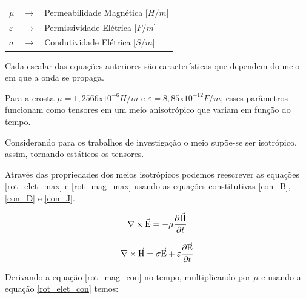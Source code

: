 	        {\footnotesize \noindent
            
            \begin{table}[H]
             \begin{tabular*}{1cm}{p{0.05cm}p{0.1cm}p{10cm}}
               {\footnotesize $\mu$}          & {\footnotesize $\rightarrow$} & {\footnotesize Permeabilidade Magnética [$H/m$] }\\
               {\footnotesize $\varepsilon$}  & {\footnotesize $\rightarrow$} & {\footnotesize Permissividade Elétrica [$F/m$] }\\
               {\footnotesize $\sigma$}       & {\footnotesize $\rightarrow$} & {\footnotesize Condutividade Elétrica [$S/m$]} \\
             \end{tabular*}

            \end{table}}
	    
	    
            Cada escalar das equações anteriores são características que dependem do meio em que a onda se propaga.
	    
            Para a crosta $\mu = 1,2566\textrm{x}10^{-6} H/m$ e $\varepsilon = 8,85
            \textrm{x}10^{-12} F/m$; esses parâmetros funcionam como tensores em um meio
            anisotrópico que variam em função do tempo.
            
            Considerando para os 
            trabalhos de investigação o meio supõe-se ser isotrópico, assim, 
            tornando estáticos os tensores.
	
            Através das propriedades dos meios isotrópicos podemos reescrever as equações \ref{rot_elet_max} e \ref{rot_mag_max} usando as equações constitutivas \ref{con_B}, \ref{con_D} e \ref{con_J}.
            
            \begin{equation}
                \label{rot_elet_con}
                \nabla \times \vec{\textrm{E}} = - \mu \dfrac{\partial \vec{\textrm{H}}}{\partial t}
            \end{equation}
            
            \begin{equation}
                \label{rot_mag_con}
                \nabla \times \vec{\textrm{H}} = \sigma \vec{\textrm{E}} + \varepsilon \dfrac{\partial \vec{\textrm{E}}}{\partial t}
            \end{equation}
            
            Derivando a equação \ref{rot_mag_con} no tempo, multiplicando por $\mu$ e usando a equação \ref{rot_elet_con} temos:
            
